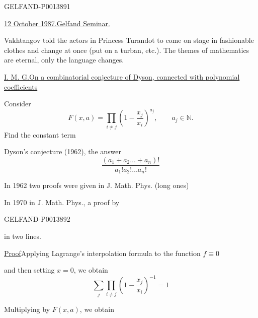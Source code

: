 \begin{GelfandAdjacentEvidence}{GELFAND-P001389}{1}

\uline{12 October 1987.}\qquad \uline{Gelfand Seminar.}

Vakhtangov told the actors in Princess Turandot to come on stage in fashionable clothes and change at once (put on a turban, etc.). The themes of mathematics are eternal, only the language changes.

\uline{I. M. G.}\quad \uline{On a combinatorial conjecture of Dyson, connected with polynomial coefficients}


Consider
\begin{equation*}
F(x,a)=\prod_{i\ne j}\left(1-\frac{x_j}{x_i}\right)^{a_j},
\qquad a_j\in\mathbb N.
\tag{1}
\end{equation*}
Find the constant term

Dyson's conjecture (1962), the answer
\begin{equation*}
\frac{(a_1+a_2\ldots+a_n)!}{a_1!a_2!\ldots a_n!}
\tag{2}
\end{equation*}

In 1962 two proofs were given in J. Math. Phys. (long ones)

In 1970 in J. Math. Phys., a proof by
\end{GelfandAdjacentEvidence}
\begin{GelfandAdjacentEvidence}{GELFAND-P001389}{2}

in two lines.

\uline{Proof}\quad Applying Lagrange's interpolation formula to the function \(f\equiv0\)
\end{GelfandAdjacentEvidence}

and then setting \(x=0\), we obtain
\begin{equation*}
\sum_j\prod_{i\ne j}\left(1-\frac{x_j}{x_i}\right)^{-1}=1
\tag{3}
\end{equation*}

Multiplying by \(F(x,a)\), we obtain


